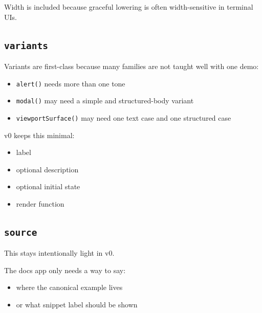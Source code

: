 Width is included because graceful lowering is often width-sensitive in terminal UIs.

\subsection{\texorpdfstring{\texttt{v\allowbreak{}a\allowbreak{}r\allowbreak{}i\allowbreak{}a\allowbreak{}n\allowbreak{}t\allowbreak{}s}}{}}\label{record-039-variants}

Variants are first-class because many families are not taught well with one demo:

\begin{itemize}
\tightlist
\item
  \texttt{a\allowbreak{}l\allowbreak{}e\allowbreak{}r\allowbreak{}t\allowbreak{}(\allowbreak{})} needs more than one tone
\item
  \texttt{m\allowbreak{}o\allowbreak{}d\allowbreak{}a\allowbreak{}l\allowbreak{}(\allowbreak{})} may need a simple and structured-body variant
\item
  \texttt{v\allowbreak{}i\allowbreak{}e\allowbreak{}w\allowbreak{}p\allowbreak{}o\allowbreak{}r\allowbreak{}t\allowbreak{}S\allowbreak{}u\allowbreak{}r\allowbreak{}f\allowbreak{}a\allowbreak{}c\allowbreak{}e\allowbreak{}(\allowbreak{})} may need one text case and one structured case
\end{itemize}

v0 keeps this minimal:

\begin{itemize}
\tightlist
\item
  label
\item
  optional description
\item
  optional initial state
\item
  render function
\end{itemize}

\subsection{\texorpdfstring{\texttt{s\allowbreak{}o\allowbreak{}u\allowbreak{}r\allowbreak{}c\allowbreak{}e}}{}}\label{record-039-source}

This stays intentionally light in v0.

The docs app only needs a way to say:

\begin{itemize}
\tightlist
\item
  where the canonical example lives
\item
  or what snippet label should be shown
\end{itemize}

